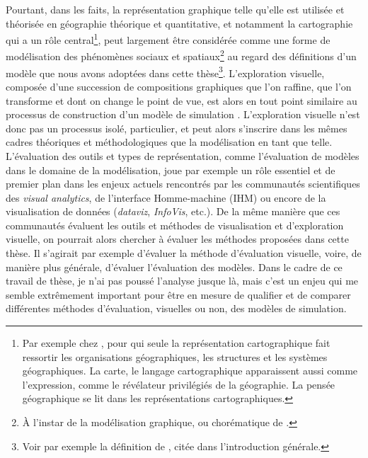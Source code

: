 Pourtant, dans les faits, la représentation graphique telle qu'elle est utilisée et théorisée en géographie théorique et quantitative, et notamment la cartographie qui a un rôle central\footnote{
	Par exemple chez \textcite[246--247]{pinchemel_geographie_1979}, pour qui \og seule la représentation cartographique fait ressortir les organisations géographiques, les structures et les systèmes géographiques.
	La carte, le langage cartographique apparaissent aussi comme l'expression, comme le révélateur privilégiés de la géographie.
	La pensée géographique se lit dans les représentations cartographiques\fg{}.
}, peut largement être considérée comme une forme de modélisation des phénomènes sociaux et spatiaux\footnote{
	À l'instar de la \og modélisation graphique\fg{}, ou chorématique de \textcite{brunet1980composition}.
} au regard des définitions d'un modèle que nous avons adoptées dans cette thèse\footnote{
	Voir par exemple la définition de \textcite{minsky_matter_1965}, citée dans l'introduction générale.	
}.
L'exploration visuelle, composée d'une succession de compositions graphiques que l'on raffine, que l'on transforme et dont on change le point de vue, est alors en tout point similaire au processus de construction d'un modèle de simulation \autocite{andrienko2018viewing}.
L'exploration visuelle n'est donc pas un processus isolé, particulier, et peut alors s'inscrire dans les mêmes cadres théoriques et méthodologiques que la modélisation en tant que telle.
L'évaluation des outils et types de représentation, comme l'évaluation de modèles dans le domaine de la modélisation, joue par exemple un rôle essentiel et de premier plan dans les enjeux actuels rencontrés par les communautés scientifiques des \textit{visual analytics}, de l'interface Homme-machine (IHM) ou encore de la visualisation de données (\textit{dataviz}, \textit{InfoVis}, etc.).
De la même manière que ces communautés évaluent les outils et méthodes de visualisation et d'exploration visuelle, on pourrait alors chercher à évaluer les méthodes proposées dans cette thèse.
Il s'agirait par exemple d'évaluer la méthode d'évaluation visuelle, voire, de manière plus générale, d'évaluer l'évaluation des modèles.
Dans le cadre de ce travail de thèse, je n'ai pas poussé l'analyse jusque là, mais c'est un enjeu qui me semble extrêmement important pour être en mesure de qualifier et de comparer différentes méthodes d'évaluation, visuelles ou non, des modèles de simulation.

